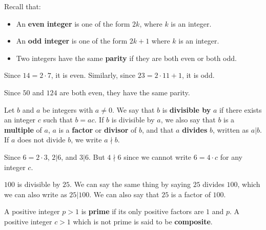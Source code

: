\begin{df}
Recall that:
\begin{itemize} 
\item An {\bf even integer} is one of the form $2k$, where $k$ is an integer.
\item An {\bf odd integer} is one of the form $2k + 1$ where $k$ is an integer.
\item Two integers have the same {\bf parity} if they are both even or both odd.
\end{itemize}
\end{df}

\begin{exa}
Since $14=2\cdot 7$, it is even. 
Similarly, since $23=2\cdot 11 + 1$, it is odd.
\end{exa}
\begin{exa}
Since $50$ and $124$ are both even, they have the same parity.
\end{exa}

\begin{df}
Let $b$ and $a$ be integers with $a\neq 0$.  We say that 
$b$ is {\bf divisible by} $a$ if there exists an integer $c$ such
that $b = ac$. 
If $b$ is divisible by $a$, 
we also say that $b$ is a {\bf multiple} of $a$,
$a$ is a {\bf factor} or {\bf divisor} of $b$, and that 
$a$ {\bf divides} $b$, written as $a|b$.  If $a$ does not divide $b$, we write $a\nmid b$. 
\end{df}

\begin{exa}
Since $6=2\cdot 3$, $2|6$, and $3|6$.  But $4\nmid 6$ since we cannot write $6=4\cdot c$ for any integer $c$.
\end{exa}

\begin{exa}
$100$ is divisible by $25$.
We can say the same thing by saying $25$ divides $100$, which 
we can also write as $25|100$. We can also say that $25$ is a factor of $100$.
\end{exa}

\begin{df}
A positive integer $p>1$ is {\bf prime} if its only positive factors are $1$ and $p$. 
A positive integer $c>1$ which is not prime is said to be
{\bf composite}.
\end{df}

